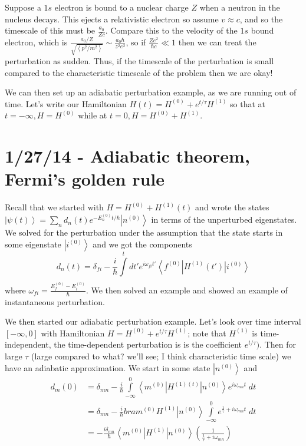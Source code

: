 \documentclass[10pt]{report}
\newcommand{\bra}[1]{\left<#1\right|}
\newcommand{\ket}[1]{\left|#1\right>}
\newcommand{\expvalue}[1]{\left<#1\right>}
\begin{document}
Suppose a $1s$ electron is bound to a nuclear charge $Z$ when a neutron in the nucleus decays. This ejects a relativistic electron so assume $v \approx c$, and so the timescale of this must be $\frac{a_0}{Zc}$. Compare this to the velocity of the $1s$ bound electron, which is $\frac{a_0/Z}{\sqrt{\expvalue{p^2/m^2}}} \sim \frac{a_0 \hbar}{z^2e^2}$, so if $\frac{Ze^2}{\hbar c} \ll 1$ then we can treat the perturbation as sudden. Thus, if the timescale of the perturbation is small compared to the characteristic timescale of the problem then we are okay!

We can then set up an adiabatic perturbation example, as we are running out of time. Let's write our Hamiltonian $H(t) = H^{(0)} + e^{t/\tau}H^{(1)}$ so that at $t=-\infty, H = H^{(0)}$ while at $t=0, H = H^{(0)} + H^{(1)}$. 

\chapter{1/27/14 - Adiabatic theorem, Fermi's golden rule}

Recall that we started with $H = H^{(0)} + H^{(1)}(t)$ and wrote the states $\ket{\psi(t)} = \sum_n d_n(t) e^{-E_n^{(0)}t/\hbar}\ket{n^{(0)}}$ in terms of the unperturbed eigenstates. We solved for the perturbation under the assumption that the state starts in some eigenstate $\ket{i^{(0)}}$ and we got the components
\begin{equation}
    d_n(t) = \delta_{fi} -\frac{i}{\hbar} \displaystyle\int\limits_{}^{t}dt' e^{i\omega_{fi}t'} \bra{f^{(0)}}H^{(1)}(t')\ket{i^{(0)}}
    \label{1.27.sol}
\end{equation}
where $\omega_{fi} = \frac{E_f^{(0)} - E_i^{(0)}}{\hbar}$. We then solved an example and showed an example of instantaneous perturbation.

We then started our adiabatic perturbation example. Let's look over time interval $\left[ -\infty,0 \right]$ with Hamiltonian $H = H^{(0)} + e^{t/\tau}H^{(1)}$; note that $H^{(1)}$ is time-independent, the time-dependent perturbation is is the coefficient $e^{t/\tau})$. Then for large $\tau$ (large compared to what? we'll see; I think characteristic time scale) we have an adiabatic approximation. We start in some state $\ket{n^{(0)}}$ and
\begin{align}
    d_m(0) &= \delta_{mn}-\frac{i}{\hbar}\displaystyle\int\limits_{-\infty}^{0}\bra{m^{(0)}}H^{(1)(t)}\ket{n^{(0)}}e^{i\omega_{mn}t}\;dt\\
    &= \delta_{mn}-\frac{i}{\hbar}bra{m^{(0)}}H^{(1)}\ket{n^{(0)}}\displaystyle\int\limits_{-\infty}^{0}e^{\frac{1}{\tau} +i\omega_{mn}t}\;dt\\
    &= -\frac{i\delta_{mn}}{\hbar}\bra{m^{(0)}}H^{(1)}\ket{n^{(0)}}\left( \frac{1}{\frac{1}{\tau} + i\omega_{mn}} \right)
\end{align}
\end{document}
